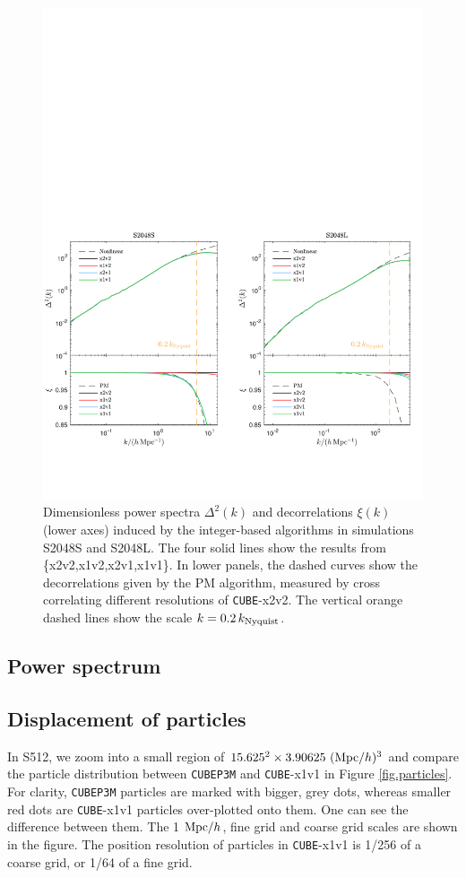 \documentclass[10pt,twocolumn,preprint]{emulateapj}
\begin{document}
\begin{figure}
\centering
  \includegraphics[width=1.0\linewidth]{f9}
 \caption{Dimensionless power spectra $\Delta^2(k)$ and decorrelations $\xi(k)$ (lower axes) induced by the integer-based algorithms in simulations S2048S and S2048L. The four solid lines show the results from \{x2v2,x1v2,x2v1,x1v1\}. In lower panels, the dashed curves show the decorrelations given by the PM algorithm, measured by cross correlating different resolutions of {\tt CUBE}-x2v2. The vertical orange dashed lines show the scale $k=0.2\, k_{\rm Nyquist}$.}
\label{fig.ccc}
\end{figure}
\subsection{Power spectrum}

\subsection{Displacement of particles}
In S512, we zoom into a small region of $15.625^2\times 3.90625\ ({\rm Mpc}/h)^3$ and compare the particle distribution between {\tt CUBEP3M} and {\tt CUBE}-x1v1 in Figure \ref{fig.particles}. For clarity, {\tt CUBEP3M} particles are marked with bigger, grey dots, whereas smaller red dots are {\tt CUBE}-x1v1 particles over-plotted onto them. One can see the difference between them. The 1 ${\rm Mpc}/h$, fine grid and coarse grid scales are shown in the figure. The position resolution of particles in {\tt CUBE}-x1v1 is 1/256 of a coarse grid, or 1/64 of a fine grid. 
\end{document}
